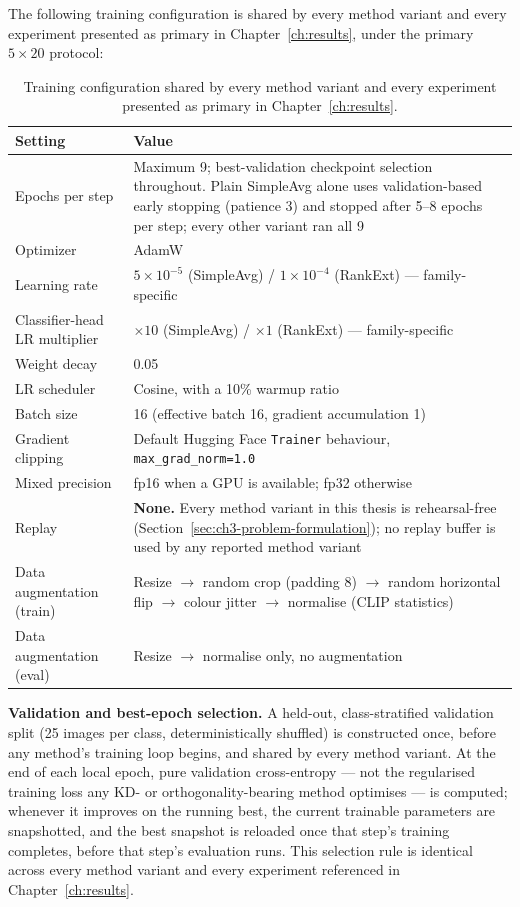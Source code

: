 The following training configuration is shared by every method variant and
every experiment presented as primary in Chapter~\ref{ch:results}, under the
primary $5\times20$ protocol:

\begin{table}[htbp]
\centering
\begin{tabularx}{\textwidth}{@{}l X@{}}
\toprule
\textbf{Setting} & \textbf{Value} \\
\midrule
Epochs per step & Maximum 9; best-validation checkpoint selection throughout. Plain SimpleAvg alone uses validation-based early stopping (patience 3) and stopped after 5--8 epochs per step; every other variant ran all 9 \\
Optimizer & AdamW \\
Learning rate & $5\times10^{-5}$ (SimpleAvg) / $1\times10^{-4}$ (RankExt) --- family-specific \\
Classifier-head LR multiplier & $\times10$ (SimpleAvg) / $\times1$ (RankExt) --- family-specific \\
Weight decay & 0.05 \\
LR scheduler & Cosine, with a 10\% warmup ratio \\
Batch size & 16 (effective batch 16, gradient accumulation 1) \\
Gradient clipping & Default Hugging Face \texttt{Trainer} behaviour, \texttt{max\_grad\_norm=1.0} \\
Mixed precision & fp16 when a GPU is available; fp32 otherwise \\
Replay & \textbf{None.} Every method variant in this thesis is rehearsal-free (Section~\ref{sec:ch3-problem-formulation}); no replay buffer is used by any reported method variant \\
Data augmentation (train) & Resize $\to$ random crop (padding 8) $\to$ random horizontal flip $\to$ colour jitter $\to$ normalise (CLIP statistics) \\
Data augmentation (eval) & Resize $\to$ normalise only, no augmentation \\
\bottomrule
\end{tabularx}
\caption[Training configuration]{Training configuration shared by every
method variant and every experiment presented as primary in
Chapter~\ref{ch:results}.}
\label{tab:ch4-training-config}
\end{table}

\textbf{Validation and best-epoch selection.} A held-out, class-stratified
validation split (25 images per class, deterministically shuffled) is
constructed once, before any method's training loop begins, and shared by
every method variant. At the end of each local epoch, pure validation
cross-entropy --- not the regularised training loss any KD- or
orthogonality-bearing method optimises --- is computed; whenever it improves on
the running best, the current trainable parameters are snapshotted, and the
best snapshot is reloaded once that step's training completes, before that
step's evaluation runs. This selection rule is identical across every method
variant and every experiment referenced in Chapter~\ref{ch:results}.

